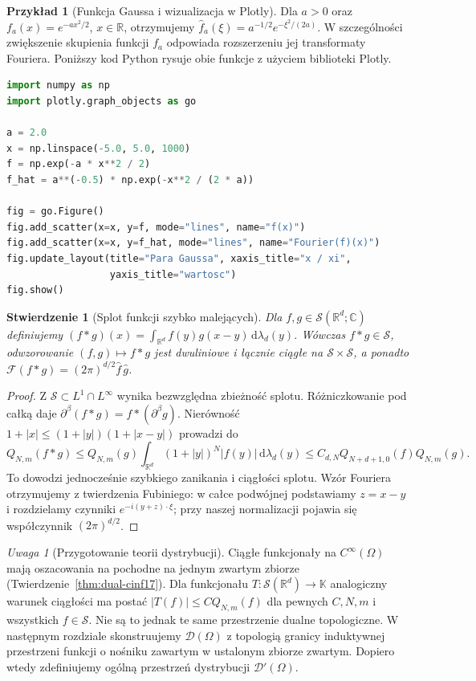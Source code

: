 \documentclass[11pt,a4paper]{article}
\numberwithin{equation}{section}
\theoremstyle{plain}
\newtheorem{stwierdzenie}[twierdzenie]{Stwierdzenie}
\theoremstyle{definition}
\newtheorem{przyklad}[twierdzenie]{Przykład}
\theoremstyle{remark}
\newtheorem{uwaga}[twierdzenie]{Uwaga}
\newcommand{\R}{\mathbb R}
\newcommand{\C}{\mathbb C}
\newcommand{\K}{\mathbb K}
\begin{document}
\begin{przyklad}[Funkcja Gaussa i wizualizacja w Plotly]
\label{ex:fourier-gauss17}
Dla $a>0$ oraz $f_a(x)=e^{-ax^2/2}$, $x\in\R$,
otrzymujemy $\widehat f_a(\xi)=a^{-1/2}e^{-\xi^2/(2a)}$.
W szczególności zwiększenie skupienia funkcji $f_a$
odpowiada rozszerzeniu jej transformaty Fouriera.
Poniższy kod Python rysuje obie funkcje z użyciem biblioteki Plotly.
\begin{lstlisting}[language=Python,caption={Para funkcji Gaussa: funkcja i transformata Fouriera}]
import numpy as np
import plotly.graph_objects as go

a = 2.0
x = np.linspace(-5.0, 5.0, 1000)
f = np.exp(-a * x**2 / 2)
f_hat = a**(-0.5) * np.exp(-x**2 / (2 * a))

fig = go.Figure()
fig.add_scatter(x=x, y=f, mode="lines", name="f(x)")
fig.add_scatter(x=x, y=f_hat, mode="lines", name="Fourier(f)(x)")
fig.update_layout(title="Para Gaussa", xaxis_title="x / xi",
                  yaxis_title="wartosc")
fig.show()
\end{lstlisting}
\end{przyklad}

\begin{stwierdzenie}[Splot funkcji szybko malejących]
\label{prop:convolution-schwartz17}
Dla $f,g\in\mathcal S(\R^d;\C)$ definiujemy
$(f*g)(x)=\int_{\R^d}f(y)g(x-y)\,\mathrm d\lambda_d(y)$.
Wówczas $f*g\in\mathcal S$, odwzorowanie
$(f,g)\mapsto f*g$ jest dwuliniowe i łącznie ciągłe
na $\mathcal S\times\mathcal S$, a ponadto
$\mathcal F(f*g)=(2\pi)^{d/2}\widehat f\,\widehat g$.
\end{stwierdzenie}
\begin{proof}
Z $\mathcal S\subset L^1\cap L^\infty$ wynika
bezwzględna zbieżność splotu. Różniczkowanie pod całką
daje $\partial^\beta(f*g)=f*(\partial^\beta g)$.
Nierówność $1+|x|\le(1+|y|)(1+|x-y|)$ prowadzi do
\[
 Q_{N,m}(f*g)\le Q_{N,m}(g)
 \int_{\R^d}(1+|y|)^N|f(y)|\,\mathrm d\lambda_d(y)
 \le C_{d,N}Q_{N+d+1,0}(f)Q_{N,m}(g).
\]
To dowodzi jednocześnie szybkiego zanikania i ciągłości
splotu. Wzór Fouriera otrzymujemy z twierdzenia Fubiniego:
w całce podwójnej podstawiamy $z=x-y$ i rozdzielamy
czynniki $e^{-i(y+z)\cdot\xi}$; przy naszej normalizacji
pojawia się współczynnik $(2\pi)^{d/2}$.
\end{proof}

\begin{uwaga}[Przygotowanie teorii dystrybucji]
\label{rem:distribution-next17}
Ciągłe funkcjonały na $C^\infty(\Omega)$ mają oszacowania
na pochodne na jednym zwartym zbiorze (Twierdzenie~\ref{thm:dual-cinf17}).
Dla funkcjonału $T:\mathcal S(\R^d)\to\K$ analogiczny warunek
ciągłości ma postać $|T(f)|\le C Q_{N,m}(f)$
dla pewnych $C,N,m$ i wszystkich $f\in\mathcal S$.
Nie są to jednak te same przestrzenie dualne topologiczne.
W następnym rozdziale skonstruujemy $\mathcal D(\Omega)$
z topologią granicy induktywnej przestrzeni funkcji o nośniku
zawartym w ustalonym zbiorze zwartym. Dopiero wtedy zdefiniujemy
ogólną przestrzeń dystrybucji $\mathcal D'(\Omega)$.
\end{uwaga}
\end{document}

